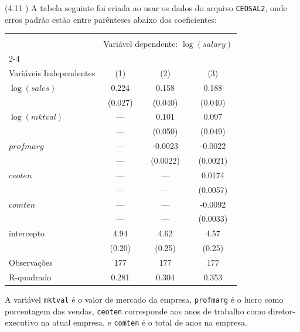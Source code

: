 \documentclass[12pt,letterpaper, onecolumn]{exam}
\begin{document}
\begin{questions}

    \question\qstar (4.11 \citep{wooldridge2016}) A tabela seguinte foi criada ao usar os dados do arquivo \texttt{CEOSAL2}, onde erros padrão estão entre parênteses abaixo dos coeficientes:

\begin{table}[h!]
\centering
\begin{tabular}{lccc}
\toprule
\hline
\\[-1.0ex]
& \multicolumn{3}{c}{Variável dependente: $\log(salary)$} \\[1.5ex]
\cline{2-4}\\[-1.0ex]
Variáveis Independentes & (1) & (2) & (3) \\[1.5ex]
\hline
$\log(sales)$   & 0.224 & 0.158 & 0.188 \\
                & (0.027) & (0.040) & (0.040) \\[0.2cm]

$\log(mktval)$  & --- & 0.101 & 0.097 \\
                & --- & (0.050) & (0.049) \\[0.2cm]

$profmarg$      & --- & -0.0023 & -0.0022 \\
                & --- & (0.0022) & (0.0021) \\[0.2cm]

$ceoten$        & --- & --- & 0.0174 \\
                & --- & --- & (0.0057) \\[0.2cm]

$comten$        & --- & --- & -0.0092 \\
                & --- & --- & (0.0033) \\[0.2cm]

intercepto      & 4.94 & 4.62 & 4.57 \\
                & (0.20) & (0.25) & (0.25) \\[0.2cm]

Observações     & 177 & 177 & 177 \\
R-quadrado      & 0.281 & 0.304 & 0.353 \\
\midrule
\bottomrule
\end{tabular}
\end{table}

A variável \texttt{mktval} é o valor de mercado da empresa, \texttt{profmarg} é o lucro como porcentagem das vendas, \texttt{ceoten} corresponde aos anos de trabalho como diretor-executivo na atual empresa, e \texttt{comten} é o total de anos na empresa.


\end{questions}
\end{document}
